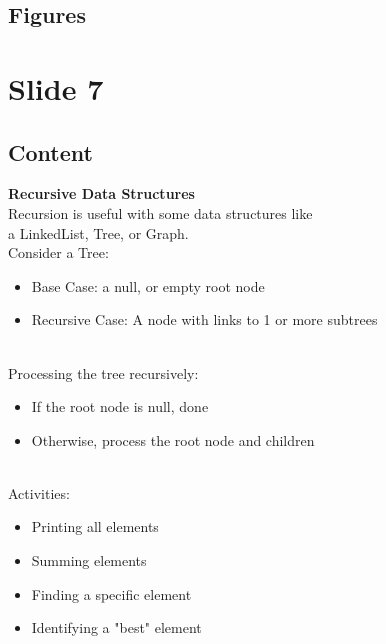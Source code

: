 \documentclass{article}%
\begin{document}
\subsection{Figures}%
\begin{figure}[H]%
\centering%
\end{figure}

%
\newpage%
\section{Slide 7}%
\label{sec:Slide7}%
\subsection{Content}%

\textbf{Recursive Data Structures} \\
Recursion is useful with some data structures like \\
a LinkedList, Tree, or Graph. \\
Consider a Tree: \\
\begin{itemize}
    \item Base Case: a null, or empty root node
    \item Recursive Case: A node with links to 1 or more subtrees
\end{itemize} \\
Processing the tree recursively: \\
\begin{itemize}
    \item If the root node is null, done
    \item Otherwise, process the root node and children
\end{itemize} \\
Activities: \\
\begin{itemize}
    \item Printing all elements
    \item Summing elements
    \item Finding a specific element
    \item Identifying a "best" element
\end{itemize}
%
\end{document}
